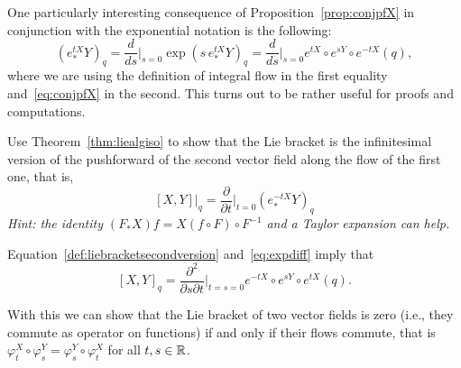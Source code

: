 \begin{remark}
  One particularly interesting consequence of Proposition~\ref{prop:conjpfX} in conjunction with the exponential notation is the following:
  \begin{equation}\label{eq:expdiff}
    \left(e_*^{tX} Y\right)_q =
    \frac{d}{ds}\Big|_{s=0} \exp\left(s\, e_*^{tX} Y\right)_q =
    \frac{d}{ds}\Big|_{s=0} e^{tX}\circ e^{sY}\circ e^{-t X}(q),
  \end{equation}
  where we are using the definition of integral flow in the first equality and~\eqref{eq:conjpfX} in the second.
  This turns out to be rather useful for proofs and computations.  
\end{remark}

\begin{exercise}
  Use Theorem~\ref{thm:liealgiso} to show that the Lie bracket is the infinitesimal version of the pushforward of the second vector field along the flow of the first one, that is,
  \begin{equation}\label{def:liebracketsecondversion}
    [X,Y]\big|_q = \frac{\partial}{\partial t}\Big|_{t=0} (e_*^{-t X} Y)_q
  \end{equation}
 \textit{\small Hint: the identity $(F_* X)f = X(f\circ F)\circ F^{-1}$ and a Taylor expansion can help.}
\end{exercise}

\begin{remark}
  Equation~\eqref{def:liebracketsecondversion} and~\eqref{eq:expdiff} imply that
  \begin{equation}\label{eq:lbddr}
    [X,Y]_q = \frac{\partial^2}{\partial s \partial t}\Big|_{t=s=0}e^{-tX}\circ e^{sY}\circ e^{t X}(q).
  \end{equation}
\end{remark}

With this we can show that the Lie bracket of two vector fields is zero (i.e., they commute as operator on functions) if and only if their flows commute, that is $\varphi^X_t \circ \varphi^Y_s = \varphi^Y_s\circ \varphi^X_t$ for all $t,s\in\mathbb{R}$.

